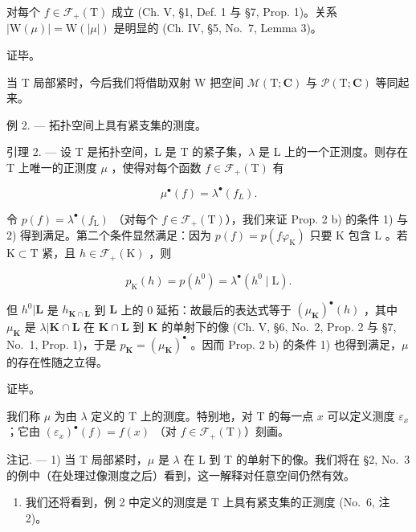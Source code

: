 对每个 \(f \in \mathcal{F}_{+}(\mathrm{T})\) 成立 (Ch. V, §1, Def. 1 与 §7, Prop. 1)。关系 \(|\mathrm{W}(\mu)| = \mathrm{W}(|\mu|)\) 是明显的 (Ch. IV, §5, No.~7, Lemma 3)。

证毕。

当 T 局部紧时，今后我们将借助双射 W 把空间 \(\mathcal{M}(\mathrm{T};\mathbf{C})\) 与 \(\mathcal{P}(\mathrm{T};\mathbf{C})\) 等同起来。

例 2. --- 拓扑空间上具有紧支集的测度。

引理 2. --- 设 T 是拓扑空间，L 是 T 的紧子集，\(\lambda\) 是 L 上的一个正测度。则存在 T 上唯一的正测度 \(\mu\) ，使得对每个函数 \(f \in \mathcal{F}_{+}(\mathrm{T})\) 有

\[
\mu^ {\bullet} (f) = \lambda^ {\bullet} (f _ {L}).\tag{2}
\]

令 \(p(f) = \lambda^{\bullet}(f_{\mathrm{L}})\) （对每个 \(f \in \mathcal{F}_{+}(\mathrm{T})\)），我们来证 Prop. 2 b) 的条件 1) 与 2) 得到满足。第二个条件显然满足：因为 \(p(f) = p(f\varphi_{\mathrm{K}})\) 只要 \(\mathrm{K}\) 包含 \(\mathrm{L}\) 。若 \(\mathrm{K} \subset \mathrm{T}\) 紧，且 \(h \in \mathcal{F}_{+}(\mathrm{K})\) ，则

\[
p _ {\mathrm{K}} (h) = p \left(h ^ {0}\right) = \lambda^ {\bullet} \left(h ^ {0} \mid \mathrm{L}\right).
\]

但 \(h^0 | \mathbf{L}\) 是 \(h_{\mathbf{K} \cap \mathbf{L}}\) 到 \(\mathbf{L}\) 上的 0 延拓：故最后的表达式等于 \((\mu_{\mathbf{K}})^{\bullet}(h)\) ，其中 \(\mu_{\mathbf{K}}\) 是 \(\lambda | \mathbf{K} \cap \mathbf{L}\) 在 \(\mathbf{K} \cap \mathbf{L}\) 到 \(\mathbf{K}\) 的单射下的像 (Ch. V, §6, No.~2, Prop. 2 与 §7, No.~1, Prop. 1)，于是 \(p_{\mathbf{K}} = (\mu_{\mathbf{K}})^{\bullet}\) 。因而 Prop. 2 b) 的条件 1) 也得到满足，\(\mu\) 的存在性随之立得。

证毕。

我们称 \(\mu\) 为由 \(\lambda\) 定义的 T 上的测度。特别地，对 T 的每一点 \(x\) 可以定义测度 \(\varepsilon_x\) ；它由 \((\varepsilon_x)^{\bullet}(f) = f(x)\) （对 \(f \in \mathcal{F}_{+}(\mathrm{T})\)）刻画。

注记. --- 1) 当 T 局部紧时，\(\mu\) 是 \(\lambda\) 在 L 到 T 的单射下的像。我们将在 §2, No.~3 的例中（在处理过像测度之后）看到，这一解释对任意空间仍然有效。

\begin{enumerate}
\def\labelenumi{\arabic{enumi})}
\setcounter{enumi}{1}
\tightlist
\item
  我们还将看到，例 2 中定义的测度是 T 上具有紧支集的正测度 (No.~6, 注 2)。
\end{enumerate}

